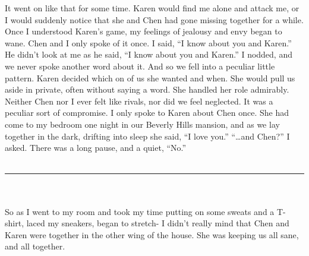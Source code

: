 \documentclass[a4paper]{article}
\begin{document}
It went on like that for some time. Karen would find me alone and attack me, or I would suddenly notice that she and Chen had gone missing together for a while. Once I understood Karen’s game, my feelings of jealousy and envy began to wane.
Chen and I only spoke of it once. I said, “I know about you and Karen.”
He didn’t look at me as he said, “I know about you and Karen.”
I nodded, and we never spoke another word about it.
And so we fell into a peculiar little pattern. Karen decided which on of us she wanted and when. She would pull us aside in private, often without saying a word. She handled her role admirably. Neither Chen nor I ever felt like rivals, nor did we feel neglected. It was a peculiar sort of compromise.
I only spoke to Karen about Chen once. She had come to my bedroom one night in our Beverly Hills mansion, and as we lay together in the dark, drifting into sleep she said, “I love you.”
“…and Chen?” I asked.
There was a long pause, and a quiet, “No.” \\ \\

\hrule ~ \\ \\

So as I went to my room and took my time putting on some sweats and a T-shirt, laced my sneakers, began to stretch- I didn’t really mind that Chen and Karen were together in the other wing of the house. She was keeping us all sane, and all together.
\end{document}
